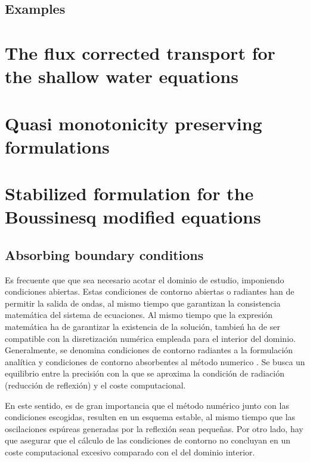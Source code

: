 \subsection{Examples}


\section{The flux corrected transport for the shallow water equations}



\section{Quasi monotonicity preserving formulations}



\section{Stabilized formulation for the Boussinesq modified equations}




\subsection{Absorbing boundary conditions}

Es frecuente que que sea necesario acotar el dominio de estudio, imponiendo condiciones abiertas. Estas condiciones de contorno abiertas o radiantes han de permitir la salida de ondas, al mismo tiempo que garantizan la consistencia matemática del sistema de ecuaciones. Al mismo tiempo que la expresión matemática ha de garantizar la existencia de la solución, tambień ha de ser compatible con la disretización numérica empleada para el interior del dominio. Generalmente, se denomina condiciones de contorno radiantes a la formulación analítica y condiciones de contorno absorbentes al método numerico \cite{navon2004}.
Se busca un equilibrio entre la precisión con la que se aproxima la condición de radiación (reducción de reflexión) y el coste computacional.

En este sentido, es de gran importancia que el método numérico junto con las condiciones escogidas, resulten en un esquema estable, al mismo tiempo que las oscilaciones espúreas generadas por la reflexión sean pequeñas.
Por otro lado, hay que asegurar que el cálculo de las condiciones de contorno no concluyan en un coste computacional excesivo comparado con el del dominio interior.

